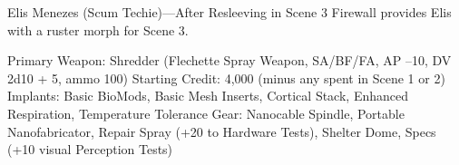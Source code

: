 ﻿Elis Menezes (Scum Techie)—After Resleeving in Scene 3
Firewall provides Elis with a ruster morph for Scene 3.

Primary Weapon: Shredder (Flechette Spray Weapon, SA/BF/FA, AP –10, DV 2d10 + 5, ammo 100)
Starting Credit: 4,000 (minus any spent in Scene 1 or 2) 
Implants: Basic BioMods, Basic Mesh Inserts, Cortical Stack, Enhanced Respiration, Temperature Tolerance
Gear: Nanocable Spindle, Portable Nanofabricator, Repair Spray (+20 to Hardware Tests), Shelter Dome, Specs (+10 visual Perception Tests)



